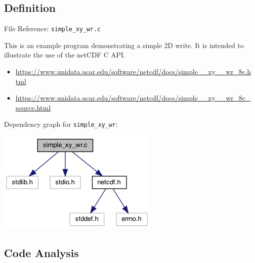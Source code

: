 \documentclass[compress,11pt,xcolor=svgnames,aspectratio=169]{beamer}
\begin{document}

\subsection{Definition}

\begin{frame}[fragile]{File Reference: \texttt{simple\_xy\_wr.c}}

This is an example program demonstrating a simple 2D write. It is intended to illustrate the use of the netCDF C API.\\[0.3cm]

\begin{itemize}
  \item \footnotesize{\url{https://www.unidata.ucar.edu/software/netcdf/docs/simple__xy__wr_8c.html}}\\[0.3cm]
  \item \footnotesize{\url{https://www.unidata.ucar.edu/software/netcdf/docs/simple__xy__wr_8c_source.html}}\\[0.4cm]
\end{itemize}

Dependency graph for \verb|simple_xy_wr|:

\begin{center}
\includegraphics[scale=0.5]{fig/simple__xy__wr_8c__incl}
\end{center}

\end{frame}

\subsection{Code Analysis}
\end{document}

